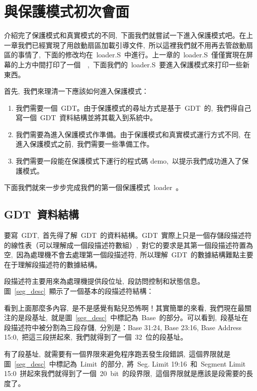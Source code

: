 \section{與保護模式初次會面}

介紹完了保護模式和真實模式的不同,~下面我們就嘗試一下進入保護模式吧。在上一章我們已經實現了用啟動扇區加載引導文件,~所以這裡我們就不用再去管啟動扇區的事情了,~下面的修改均在~loader.S~中進行。上一章的~loader.S~僅僅實現在屏幕的上方中間打印了一個~~,~下面我們的~loader.S~要進入保護模式來打印一些新東西。

首先,~我們來理清一下應該如何進入保護模式：

\begin{enumerate}
  \item 我們需要一個~GDT。由于保護模式的尋址方式是基于~GDT~的,~我們得自己寫一個~GDT~資料結構並將其載入到系統中。
  \item 我們需要為進入保護模式作準備。由于保護模式和真實模式運行方式不同,~在進入保護模式之前,~我們需要一些準備工作。
  \item 我們需要一段能在保護模式下運行的程式碼 demo,~以提示我們成功進入了保護模式。
\end{enumerate}

下面我們就來一步步完成我們的第一個保護模式~loader~。

\subsection{GDT~資料結構}

要寫~GDT,~首先得了解~GDT~的資料結構。GDT~實際上只是一個存儲段描述符的線性表（可以理解成一個段描述符數組）,~對它的要求是其第一個段描述符置為空,~因為處理機不會去處理第一個段描述符,~所以理解~GDT~的數據結構難點主要在于理解段描述符的數據結構。

段描述符主要用來為處理機提供段位址,~段訪問控制和狀態信息。圖~\ref{seg_desc}~顯示了一個基本的段描述符結構：


看到上面那麼多內容,~是不是感覺有點兒恐怖啊！其實簡單的來看,~我們現在最關注的是段基址,~就是圖~\ref{seg_desc}~中標記為~Base~的部分。可以看到,~段基址在段描述符中被分割為三段存儲,~分別是：Base 31:24, Base 23:16, Base Address 15:0,~把這三段拼起來,~我們就得到了一個~32~位的段基址。

有了段基址,~就需要有一個界限來避免程序跑丟發生段錯誤,~這個界限就是圖~\ref{seg_desc}~中標記為~Limit~的部分,~將~Seg. Limit 19:16~和~Segment Limit 15:0~拼起來我們就得到了一個~20~bit~的段界限,~這個界限就是應該是段需要的長度了。

